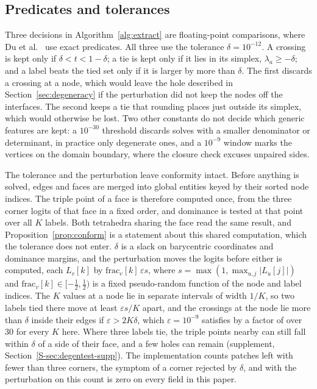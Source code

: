 \documentclass{egpubl}
\newcommand{\sref}[1]{\ref*{S-#1}}
\newcommand{\suppp}[1]{supplement, Section~\sref{#1}}
\theoremstyle{definition}
\begin{document}
\subsection{Predicates and tolerances}
\label{sec:predicates}

Three decisions in Algorithm~\ref{alg:extract} are floating-point comparisons,
where Du et al.~\cite{du2022} use exact predicates. All three use the tolerance $\delta = 10^{-12}$. A crossing is kept only if
$\delta < t < 1 - \delta$; a tie is kept only if it lies in its simplex,
$\lambda_a \ge -\delta$; and a label beats the tied set only if it is larger by
more than $\delta$. The first
discards a crossing at a node, which would leave the hole described in
Section~\ref{sec:degeneracy} if the perturbation did not keep the nodes off
the interfaces. The second keeps a tie that rounding places just outside its
simplex, which would otherwise be lost. Two other constants do not decide
which generic features are kept: a $10^{-30}$ threshold discards solves with
a smaller denominator or determinant, in practice only degenerate ones, and a
$10^{-9}$ window marks the vertices on the domain boundary, where the closure
check excuses unpaired sides.

The tolerance and the perturbation leave conformity intact. Before
anything is solved, edges and faces are merged into global entities keyed by
their sorted node indices. The triple point of a face is therefore computed
once, from the three corner logits of that face in a fixed order, and
dominance is tested at that point over all $K$ labels. Both tetrahedra sharing
the face read the same result, and Proposition~\ref{prop:conform} is a
statement about this shared computation, which the tolerance does not enter.
$\delta$ is a slack on barycentric coordinates and dominance margins, and the
perturbation moves the logits before either is computed, each $L_v[k]$ by
$\mathrm{frac}_v[k]\,\varepsilon s$, where $s = \max(1, \max_{u,j} |L_u[j]|)$
and $\mathrm{frac}_v[k] \in [-\tfrac12, \tfrac12)$ is a fixed pseudo-random
function of the node and label indices.
The $K$ values at a node lie in separate intervals of width $1/K$, so two labels tied there move
at least $\varepsilon s/K$ apart, and the crossings at the node lie more than
$\delta$ inside their edges if $\varepsilon > 2K\delta$, which
$\varepsilon = 10^{-9}$ satisfies by a factor of over $30$ for every $K$ here. Where
three labels tie, the triple points nearby can still fall within $\delta$ of a
side of their face, and a few holes can remain (\suppp{sec:degentest-supp}). The
implementation counts patches left with fewer than three corners, the symptom
of a corner rejected by $\delta$, and with the perturbation on this count is
zero on every field in this paper.
\end{document}
